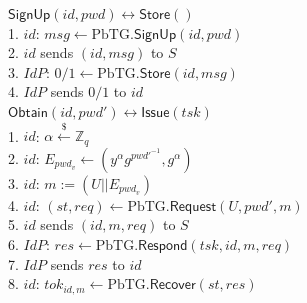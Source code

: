 \documentclass[conference]{IEEEtran}
\newcommand{\pwd}{pwd}
\newcommand{\uid}{id}
\newcommand{\tsk}{tsk}
\begin{document}
\begin{figure}
\begin{multicols}{2}
\noindent\underline{$\mathsf{SignUp}(\uid, \pwd) \longleftrightarrow \mathsf{Store}()$}\\
1. $\uid$: $msg \leftarrow \text{PbTG}.\mathsf{SignUp}(\uid,\pwd)$\\
2. $\uid$ sends $(\uid,msg)$ to $S$\\
3. $IdP$: $0/1 \leftarrow \text{PbTG}.\mathsf{Store}(\uid, msg)$\\
4. $IdP$ sends $0/1$ to $\uid$\\

\noindent\underline{$\mathsf{Obtain}(\uid, \pwd') \longleftrightarrow \mathsf{Issue}(\tsk)$}\\
1. $\uid$: $\alpha \xleftarrow{\$} \mathbb{Z}_q$\\
2. $\uid$: $E_{\pwd_{v}} \leftarrow (y^{\alpha} g^{{\pwd'}^{-1}}, g^{\alpha})$\\
3. $\uid$: $m := (U||E_{\pwd_{v}})$\\
4. $\uid$: $(st,req) \leftarrow \text{PbTG}.\mathsf{Request}(U,\pwd', m)$   \\   
5. $\uid$ sends $(\uid,m,req)$ to $S$\\
6. $IdP$:  $res \leftarrow \text{PbTG}.\mathsf{Respond}(\tsk,\uid,m,req)$\\
7. $IdP$ sends $res$ to $\uid$\\
8. $\uid$: $tok_{\uid,m} \leftarrow \text{PbTG}.\mathsf{Recover}(st,res)$\\


\end{multicols}
\end{figure}
\end{document}
